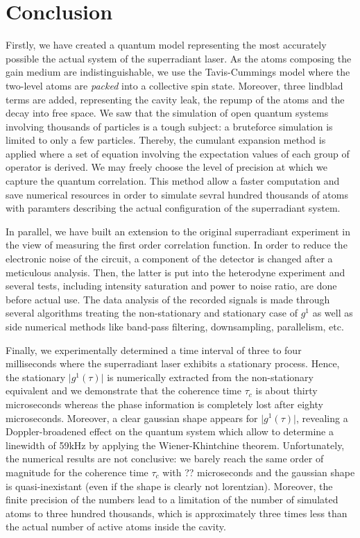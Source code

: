 \documentclass[11pt]{report}
\begin{document}
\chapter{Conclusion}

Firstly, we have created a quantum model representing the most accurately possible the actual system of the superradiant laser. As the atoms composing the gain medium are indistinguishable, we use the Tavis-Cummings model where the two-level atoms are \textit{packed} into a collective spin state. Moreover, three lindblad terms are added, representing the cavity leak, the repump of the atoms and the decay into free space. We saw that the simulation of open quantum systems involving thousands of particles is a tough subject: a bruteforce simulation is limited to only a few particles. Thereby, the cumulant expansion method is applied where a set of equation involving the expectation values of each group of operator is derived. We may freely choose the level of precision at which we capture the quantum correlation. This method allow a faster computation and save numerical resources in order to simulate sevral hundred thousands of atoms with paramters describing the actual configuration of the superradiant system.

In parallel, we have built an extension to the original superradiant experiment in the view of measuring the first order correlation function. In order to reduce the electronic noise of the circuit, a component of the detector is changed after a meticulous analysis. Then, the latter is put into the heterodyne experiment and several tests, including intensity saturation and power to noise ratio, are done before actual use. The data analysis of the recorded signals is made through several algorithms treating the non-stationary and stationary case of $g^1$ as well as side numerical methods like band-pass filtering, downsampling, parallelism, etc.

Finally, we experimentally determined a time interval of three to four milliseconds where the superradiant laser exhibits a stationary process. Hence, the stationary $\vert g^1(\tau) \vert$ is numerically extracted from the non-stationary equivalent and we demonstrate that the coherence time $\tau_c$ is about thirty microseconds whereas the phase information is completely lost after eighty microseconds. Moreover, a clear gaussian shape appears for $\vert g^1(\tau) \vert$, revealing a Doppler-broadened effect on the quantum system which allow to determine a linewidth of 59kHz by applying the Wiener-Khintchine theorem. Unfortunately, the numerical results are not conclusive: we barely reach the same order of magnitude for the coherence time $\tau_c$ with ?? microseconds and the gaussian shape is quasi-inexistant (even if the shape is clearly not lorentzian). Moreover, the finite precision of the numbers lead to a limitation of the number of simulated atoms to three hundred thousands, which is approximately three times less than the actual number of active atoms inside the cavity.
\end{document}
